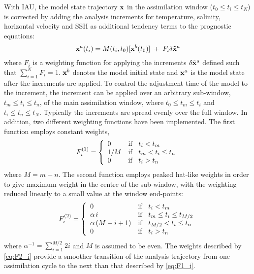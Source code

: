\documentclass[../tex_main/NEMO_manual]{subfiles}
\begin{document}
With IAU, the model state trajectory ${\bf x}$ in the assimilation window ($t_{0} \leq t_{i} \leq t_{N}$)
is corrected by adding the analysis increments for temperature, salinity, horizontal velocity and SSH as
additional tendency terms to the prognostic equations:
\begin{align}     \label{eq:wa_traj_iau}
{\bf x}^{a}(t_{i}) = M(t_{i}, t_{0})[{\bf x}^{b}(t_{0})] 
\; + \; F_{i} \delta \tilde{\bf x}^{a} 
\end{align}
where $F_{i}$ is a weighting function for applying the increments $\delta\tilde{\bf x}^{a}$ defined such that
$\sum_{i=1}^{N} F_{i}=1$.
${\bf x}^b$ denotes the model initial state and ${\bf x}^a$ is the model state after the increments are applied.
To control the adjustment time of the model to the increment,
the increment can be applied over an arbitrary sub-window, $t_{m} \leq t_{i} \leq t_{n}$,
of the main assimilation window, where $t_{0} \leq t_{m} \leq t_{i}$ and $t_{i} \leq t_{n} \leq t_{N}$.
Typically the increments are spread evenly over the full window.
In addition, two different weighting functions have been implemented.
The first function employs constant weights, 
\begin{align}    \label{eq:F1_i}
F^{(1)}_{i}
=\left\{ \begin{array}{ll}
   0     &    {\rm if} \; \; \; t_{i} < t_{m}                \\
   1/M &    {\rm if} \; \; \; t_{m} < t_{i} \leq t_{n} \\
   0     &    {\rm if} \; \; \; t_{i} > t_{n}
  \end{array} \right. 
\end{align}
where $M = m-n$.
The second function employs peaked hat-like weights in order to give maximum weight in the centre of the sub-window,
with the weighting reduced linearly to a small value at the window end-points:
\begin{align}     \label{eq:F2_i}
F^{(2)}_{i}
=\left\{ \begin{array}{ll}
   0                           &    {\rm if} \; \; \; t_{i}       <     t_{m}                        \\
   \alpha \, i               &    {\rm if} \; \; \; t_{m}    \leq t_{i}    \leq   t_{M/2}   \\
   \alpha \, (M - i +1) &    {\rm if} \; \; \; t_{M/2}  <    t_{i}    \leq   t_{n}       \\
   0                            &   {\rm if} \; \; \; t_{i}        >    t_{n}
  \end{array} \right.
\end{align}
where $\alpha^{-1} = \sum_{i=1}^{M/2} 2i$ and $M$ is assumed to be even. 
The weights described by \autoref{eq:F2_i} provide a smoother transition of the analysis trajectory from
one assimilation cycle to the next than that described by \autoref{eq:F1_i}.
\end{document}
